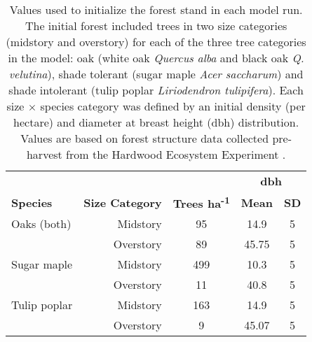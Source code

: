 
\begin{table}[htbp]
  \centering
  \caption{Values used to initialize the forest stand in each model run. The initial forest included trees in two size categories (midstory and overstory) for each of the three tree categories in the model: oak (white oak \textit{Quercus alba} and black oak \textit{Q. velutina}), shade tolerant (sugar maple \textit{Acer saccharum}) and shade intolerant (tulip poplar \textit{Liriodendron tulipifera}). Each size $\times$ species category was defined by an initial density (per hectare) and diameter at breast height (dbh) distribution. Values are based on forest structure data collected pre-harvest from the Hardwood Ecosystem Experiment \citep{Saunders2013}.}
    \begin{tabular}{rrccc}
    \toprule
    \textbf{} & \textbf{} & \textbf{} & \multicolumn{2}{c}{\textbf{dbh}} \\
    \multicolumn{1}{l}{\textbf{Species}} & \textbf{Size Category} & \textbf{Trees ha\textsuperscript{-1}} & \textbf{Mean} & \textbf{SD} \\
        \midrule
    \multicolumn{1}{l}{Oaks (both)} & Midstory & 95    & 14.9  & 5 \\
          & Overstory & 89    & 45.75 & 5 \\
    \multicolumn{1}{l}{Sugar maple} & Midstory & 499   & 10.3  & 5 \\
          & Overstory & 11    & 40.8  & 5 \\
    \multicolumn{1}{l}{Tulip poplar} & Midstory & 163   & 14.9  & 5 \\
          & Overstory & 9     & 45.07 & 5 \\
    \bottomrule
    \end{tabular}%
  \label{tab:1}%
\end{table}%
